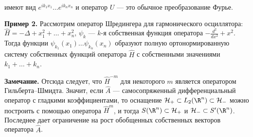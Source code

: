 \documentclass[a4paper
]{article}
\begin{document}
имеют вид $e^{ik_1x_1}\dots e^{ik_nx_n}$ и оператор $U$ --- это
обычное преобразование Фурье. \par {\bf Пример 2.} Рассмотрим
оператор Шредингера для гармонического осциллятора: $\hat
H=-\Delta+x_1^2+\dots+x_n^2$, $\psi_k$ --- $k$-я собственная
функция оператора $-\frac{d^2}{dx^2}+x^2$. Тогда функции
$\psi_{k_1}(x_1)\dots \psi_{k_n}(x_n)$ образуют полную
ортонормированную систему собственных функций оператора $\hat H$ с
собственными значениями $k_1+\dots+k_n$. \par {\bf Замечание.}
Отсюда следует, что $\hat H^{-m}$ для некоторого $m$ является
оператором Гильберта--Шмидта. Значит, если $\hat A$ ---
самосопряженный дифференциальный оператор с гладкими
коэффициентами, то оснащение ${\cal H}_+\subset L_2(\R^n)\subset
{\cal H}_-$ можно построить с помощью оператора $\hat H^m$, и
тогда $S(\R^n)\subset {\cal H}_+$ и ${\cal H}_-\subset S'(\R^n)$.
Последнее дает ограничение на рост обобщенных собственных векторов
оператора $\hat A$.
\end{document}
